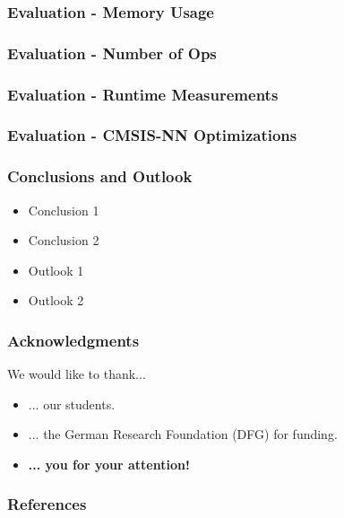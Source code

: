 \documentclass{tum-presentation}
\begin{document}
\begin{frame}
  \frametitle{Evaluation - Memory Usage}


\end{frame}

\begin{frame}
  \frametitle{Evaluation - Number of Ops}


\end{frame}

\begin{frame}
  \frametitle{Evaluation - Runtime Measurements}


\end{frame}

\begin{frame}
  \frametitle{Evaluation - CMSIS-NN Optimizations}


\end{frame}

\begin{frame}
  \frametitle{Conclusions and Outlook}

  \begin{itemize}
  \item Conclusion 1
  \item Conclusion 2
  \end{itemize}

  \pause

  \begin{itemize}
  \item Outlook 1
  \item Outlook 2
  \end{itemize}

\end{frame}

\begin{frame}
  \frametitle{Acknowledgments}

  We would like to thank...

  \begin{itemize}
  \item ... our students.
  \item ... the German Research Foundation (DFG) for funding.
    \vspace{2cm}
  \item \textbf{... you for your attention!}
  \end{itemize}
\end{frame}

\begin{frame}
  \frametitle{References}

  \printbibliography

\end{frame}
\end{document}
